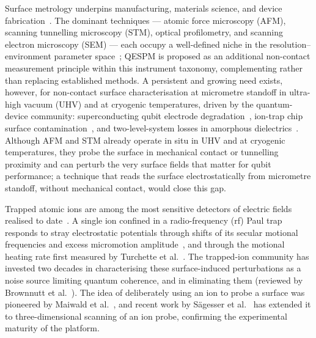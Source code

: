 \documentclass[12pt,a4paper]{article}
\begin{document}
Surface metrology underpins manufacturing, materials science, and device
fabrication~\cite{leach2011optical,townsend2016surface}.  The dominant
techniques --- atomic force microscopy (AFM),
scanning tunnelling microscopy (STM), optical profilometry, and scanning
electron microscopy (SEM) --- each occupy a well-defined niche in the
resolution--environment parameter space~\cite{iso25178}; QESPM is
proposed as an additional non-contact measurement principle within this
instrument taxonomy, complementing rather than replacing established
methods.  A persistent and
growing need exists, however, for non-contact surface characterisation at
micrometre standoff in ultra-high vacuum (UHV) and at cryogenic
temperatures, driven by the quantum-device community: superconducting
qubit electrode degradation~\cite{oliver2013materials}, ion-trap chip
surface contamination~\cite{brownnutt2015review}, and two-level-system
losses in amorphous dielectrics~\cite{muller2019quantum}.  Although AFM
and STM already operate in situ in UHV and at cryogenic temperatures, they
probe the surface in mechanical contact or tunnelling proximity and can
perturb the very surface fields that matter for qubit performance; a
technique that reads the surface electrostatically from micrometre
standoff, without mechanical contact, would close this gap.

Trapped atomic ions are among the most sensitive detectors of electric
fields realised to date~\cite{keller2015electrometry}.  A single ion
confined in a radio-frequency (rf) Paul trap responds to stray
electrostatic potentials through shifts of its secular motional
frequencies and excess micromotion
amplitude~\cite{leibfried2003review}, and through the motional heating
rate first measured by Turchette et al.~\cite{turchette2000heating}.  The
trapped-ion community has invested two decades in characterising these
surface-induced perturbations as a noise source limiting quantum
coherence, and in eliminating them (reviewed by Brownnutt et
al.~\cite{brownnutt2015review}).  The idea of deliberately using an ion to
probe a surface was pioneered by Maiwald et al.~\cite{maiwald2009stylus},
and recent work by S{\"a}gesser et al.~\cite{sagesser2026scanning} has
extended it to three-dimensional scanning of an ion probe, confirming the
experimental maturity of the platform.
\end{document}
